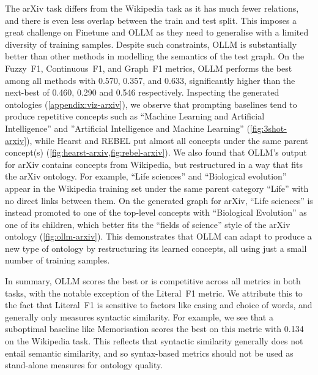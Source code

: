 \documentclass{article}
\newcommand{\name}{{OLLM}\xspace}
\begin{document}
The arXiv task differs from the Wikipedia task as it has much fewer relations, and there is even less overlap between the train and test split. This imposes a great challenge on Finetune and \name as they need to generalise with a limited diversity of training samples. Despite such constraints, \name is substantially better than other methods in modelling the semantics of the test graph. 
On the Fuzzy~F1, Continuous~F1, and Graph~F1 metrics, \name performs the best among all methods with 0.570, 0.357, and 0.633, significantly higher than the next-best of 0.460, 0.290 and 0.546 respectively. 
Inspecting the generated ontologies (\cref{appendix:viz-arxiv}), we observe that prompting baselines tend to produce repetitive concepts such as ``Machine Learning and Artificial Intelligence'' and ''Artificial Intelligence and Machine Learning'' (\cref{fig:3shot-arxiv}), while Hearst and REBEL put almost all concepts under the same parent concept(s) (\cref{fig:hearst-arxiv,fig:rebel-arxiv}). 
We also found that \name's output for arXiv contains concepts from Wikipedia, but restructured in a way that fits the arXiv ontology. For example, ``Life sciences'' and ``Biological evolution'' appear in the Wikipedia training set under the same parent category ``Life'' with no direct links between them. On the generated graph for arXiv, ``Life sciences'' is instead promoted to one of the top-level concepts with ``Biological Evolution'' as one of its children, which better fits the ``fields of science'' style of the arXiv ontology (\cref{fig:ollm-arxiv}). This demonstrates that \name can adapt to produce a new type of ontology by restructuring its learned concepts, all using just a small number of training samples. 

In summary, \name scores the best or is competitive across all metrics in both tasks, with the notable exception of the Literal~F1 metric. We attribute this to the fact that Literal~F1 is sensitive to factors like casing and choice of words, and generally only measures syntactic similarity. For example, we see that a suboptimal baseline like Memorisation scores the best on this metric with 0.134 on the Wikipedia task. This reflects that syntactic similarity generally does not entail semantic similarity, and so syntax-based metrics should not be used as stand-alone measures for ontology quality. 

\end{document}
